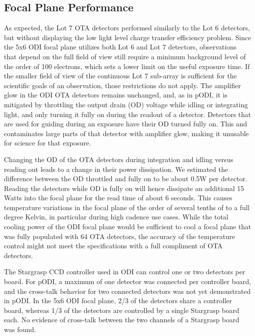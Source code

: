 \documentclass[]{spieman}
\begin{document}
\subsection{Focal Plane Performance}

As expected, the Lot 7 OTA detectors performed similarly to the Lot 6 detectors, but without
displaying the low light level charge transfer efficiency problem. Since the 5x6
ODI focal plane utilizes both Lot 6 and Lot 7 detectors, observations that
depend on the full field of view still require a minimum background level of the
order of 100 electrons, which sets a lower limit on the useful exposure time. If
the smaller field of view of the continuous Lot 7 sub-array is sufficient for the
scientific goals of an observation, those
restrictions do not apply. The amplifier glow in the ODI OTA detectors remains
unchanged, and, as in pODI, it is mitigated by throttling the output drain (OD) voltage
while idling or integrating light,  and only turning it fully on during the readout
of a detector. Detectors that are used for guiding during an exposure 
have their OD turned fully on. This and contaminates large parts of that detector 
with amplifier glow, making it unusable for science for that exposure.

Changing the OD of the OTA detectors during integration and idling versus reading out
leads to a change in their power dissipation. We estimated the difference
between the OD throttled and fully on to be about 0.5W per detector. Reading
the detectors while OD is fully on will hence dissipate an additional 15 Watts
into the focal plane for the read time of about 6 seconds. This causes
temperature variations in the focal plane of the order of several  tenths of
to a full degree Kelvin, in particular during high cadence use cases. While
the total cooling power of the ODI focal plane would be sufficient to cool a
focal plane that was fully populated with 64 OTA detectors, the accuracy of the
temperature control might not meet the specifications with a full compliment of 
OTA detectors.


The Stargrasp CCD controller\cite{onaka2008} used in ODI can control one or two
detectors per board. For pODI, a maximum of one detector was connected per controller 
board, and the cross-talk behavior for two connected detectors was not yet demonstrated
in pODI. In the 5x6 ODI focal plane, 2/3 of the detectors share a controller
board, whereas 1/3 of the detectors are controlled by a single Stargrasp board
each. No evidence of cross-talk between the two channels of a Stargrasp board
was found.
\end{document}
